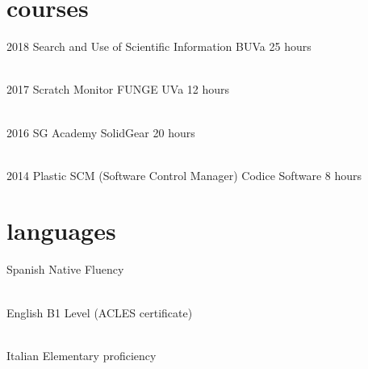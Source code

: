 \documentclass{friggeri-cv}
\begin{document}


  \section{courses}

    \begin{entrylist}

      \entry
      {2018}
      {Search and Use of Scientific Information}
      {BUVa}
      {25 hours}

      \\
      \entry
      {2017}
      {Scratch Monitor}
      {FUNGE UVa}
      {12 hours}

      \\
      \entry
      {2016}
      {SG Academy}
      {SolidGear}
      {20 hours}

      \\
      \entry
      {2014}
      {Plastic SCM (Software Control Manager)}
      {Codice Software}
      {8 hours}

    \end{entrylist}



  \section{languages}

    \begin{entrylist}

      \entry
      {}
      {Spanish}
      {}
      {Native Fluency}

      \\
      \entry
      {}
      {English}
      {}
      {B1 Level (ACLES certificate)}

      \\
      \entry
      {}
      {Italian}
      {}
      {Elementary proficiency}

    \end{entrylist}
\end{document}
